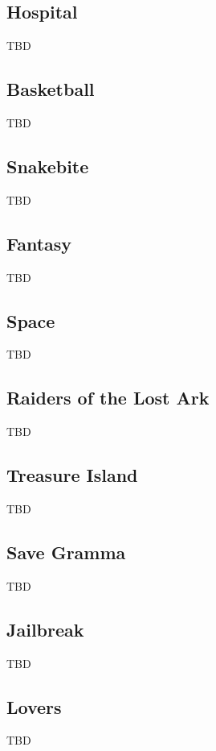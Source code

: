 \documentclass{nilreport}
\begin{document}
\subsection{Hospital}

TBD

\subsection{Basketball}

TBD

\subsection{Snakebite}

TBD

\subsection{Fantasy}

TBD

\subsection{Space}

TBD

\subsection{Raiders of the Lost Ark}

TBD

\subsection{Treasure Island}

TBD

\subsection{Save Gramma}

TBD

\subsection{Jailbreak}

TBD

\subsection{Lovers}

TBD




\end{document}
